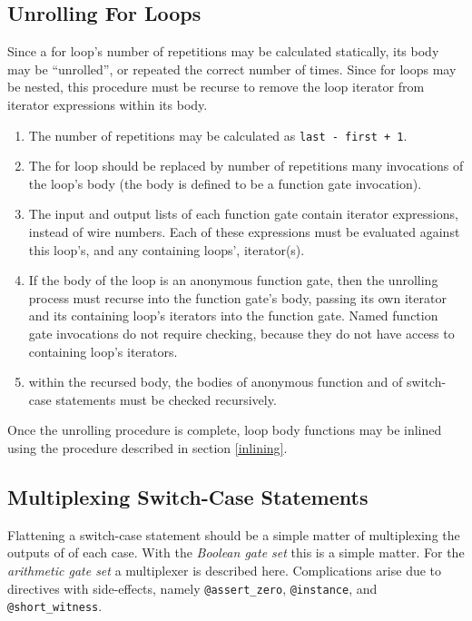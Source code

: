\subsection{Unrolling For Loops}\label{unrolling}
Since a for loop's number of repetitions may be calculated statically, its body may be ``unrolled'', or repeated the correct number of times.
Since for loops may be nested, this procedure must be recurse to remove the loop iterator from iterator expressions within its body.\\

\begin{enumerate}
    \item The number of repetitions may be calculated as \texttt{last - first + 1}.
    \item The for loop should be replaced by number of repetitions many invocations of the loop's body (the body is defined to be a function gate invocation).
    \item The input and output lists of each function gate contain iterator expressions, instead of wire numbers.
    Each of these expressions must be evaluated against this loop's, and any containing loops', iterator(s).
    \item If the body of the loop is an anonymous function gate, then the unrolling process must recurse into the function gate's body, passing its own iterator and its containing loop's iterators into the function gate.
    Named function gate invocations do not require checking, because they do not have access to containing loop's iterators.
    \item within the recursed body, the bodies of anonymous function and of switch-case statements must be checked recursively.
\end{enumerate}

Once the unrolling procedure is complete, loop body functions may be inlined using the procedure described in section \ref{inlining}.\\

\subsection{Multiplexing Switch-Case Statements}\label{multiplexing}
Flattening a switch-case statement should be a simple matter of multiplexing the outputs of of each case.
With the \textit{Boolean gate set} this is a simple matter.
For the \textit{arithmetic gate set} a multiplexer is described here.
Complications arise due to directives with side-effects, namely \texttt{@assert\_zero}, \texttt{@instance}, and \texttt{@short\_witness}.


